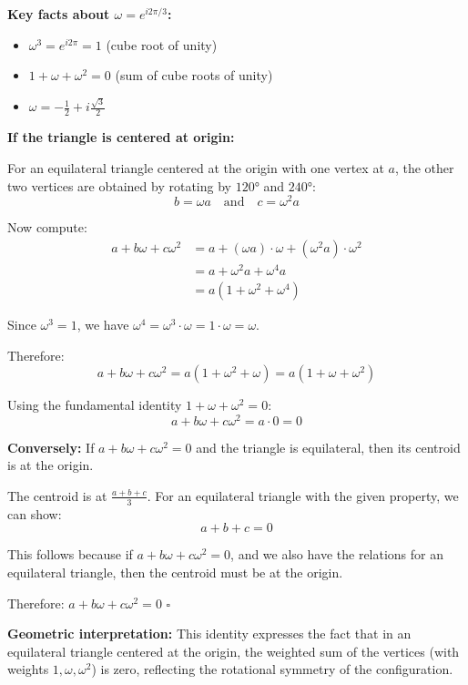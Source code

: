 \begin{solution}[Sketch]
\textbf{Key facts about $\omega = e^{i2\pi/3}$:}
\begin{itemize}[leftmargin=*]
  \item $\omega^3 = e^{i2\pi} = 1$ (cube root of unity)
  \item $1 + \omega + \omega^2 = 0$ (sum of cube roots of unity)
  \item $\omega = -\frac{1}{2} + i\frac{\sqrt{3}}{2}$
\end{itemize}

\textbf{If the triangle is centered at origin:}

For an equilateral triangle centered at the origin with one vertex at $a$, the other two vertices are obtained by rotating by $120°$ and $240°$:
\[
b = \omega a \quad \text{and} \quad c = \omega^2 a
\]

Now compute:
\begin{align*}
a + b\omega + c\omega^2 &= a + (\omega a) \cdot \omega + (\omega^2 a) \cdot \omega^2\\
&= a + \omega^2 a + \omega^4 a\\
&= a(1 + \omega^2 + \omega^4)
\end{align*}

Since $\omega^3 = 1$, we have $\omega^4 = \omega^3 \cdot \omega = 1 \cdot \omega = \omega$.

Therefore:
\[
a + b\omega + c\omega^2 = a(1 + \omega^2 + \omega) = a(1 + \omega + \omega^2)
\]

Using the fundamental identity $1 + \omega + \omega^2 = 0$:
\[
a + b\omega + c\omega^2 = a \cdot 0 = 0
\]

\textbf{Conversely:} If $a + b\omega + c\omega^2 = 0$ and the triangle is equilateral, then its centroid is at the origin.

The centroid is at $\frac{a + b + c}{3}$. For an equilateral triangle with the given property, we can show:
\[
a + b + c = 0
\]

This follows because if $a + b\omega + c\omega^2 = 0$, and we also have the relations for an equilateral triangle, then the centroid must be at the origin.

Therefore: $a + b\omega + c\omega^2 = 0$ \quad $\square$

\textbf{Geometric interpretation:} This identity expresses the fact that in an equilateral triangle centered at the origin, the weighted sum of the vertices (with weights $1, \omega, \omega^2$) is zero, reflecting the rotational symmetry of the configuration.

\end{solution}

